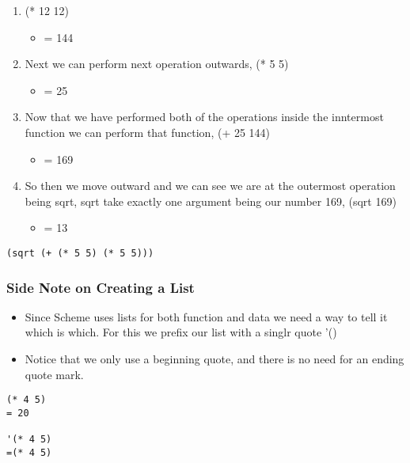 \documentclass[11pt]{article}
\begin{document}
\begin{itemize}
\begin{itemize}
\begin{enumerate}
\item (* 12 12)
\begin{itemize}
\item = 144
\end{itemize}
\item Next we can perform next operation outwards,  (* 5 5)
\begin{itemize}
\item = 25
\end{itemize}
\item Now that we have performed both of the operations inside the inntermost function we can perform that function, (+ 25 144)
\begin{itemize}
\item = 169
\end{itemize}
\item So then we move outward and we can see we are at the outermost operation being sqrt, sqrt take exactly one argument being our number 169, (sqrt 169)
\begin{itemize}
\item = 13
\end{itemize}
\end{enumerate}
\end{itemize}
\end{itemize}
\begin{verbatim}
(sqrt (+ (* 5 5) (* 5 5)))
\end{verbatim}

\subsubsection{Side Note on Creating a List}
\label{sec:org6235270}
\begin{itemize}
\item Since Scheme uses lists for both function and data we need a way to tell it which is which. For this we prefix our list with a singlr quote '()
\item Notice that we only use a beginning quote, and there is no need for an ending quote mark.
\end{itemize}
\begin{verbatim}
(* 4 5)
= 20

'(* 4 5)
=(* 4 5)
\end{verbatim}
\end{document}
